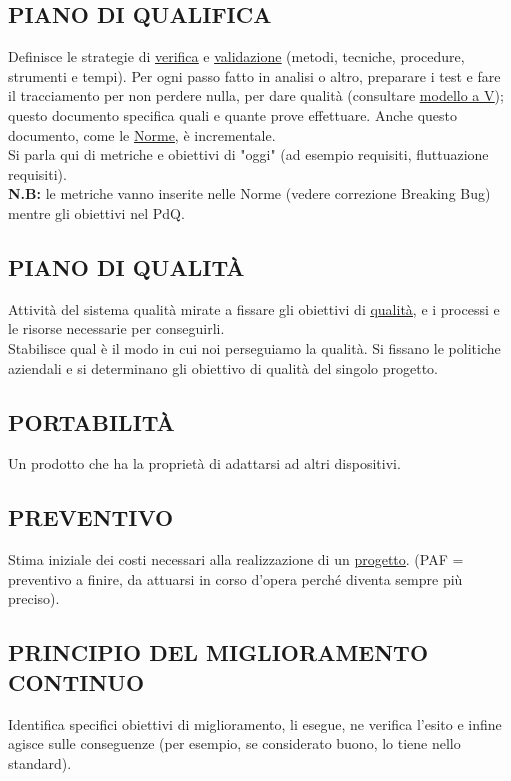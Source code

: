 		\subsection{PIANO DI QUALIFICA}		\label{pianoqualifica}
		Definisce le strategie di \underline{\hyperref[verificare]{verifica}} e \underline{\hyperref[validare]{validazione}} (metodi, tecniche, procedure, strumenti e tempi). Per ogni passo fatto in analisi o altro, preparare i test e fare il tracciamento per non perdere nulla, per dare qualità (consultare \underline{\hyperref[V]{modello a V}}); questo documento specifica quali e quante prove effettuare. Anche questo documento, come le \underline{\hyperref[norme]{Norme}}, è incrementale. \\
		Si parla qui di metriche e obiettivi di "oggi" (ad esempio requisiti, fluttuazione requisiti). \\
		\textbf{N.B:} le metriche vanno inserite nelle Norme (vedere correzione Breaking Bug) mentre gli obiettivi nel PdQ.
		
		\subsection{PIANO DI QUALITÀ}		\label{pianoqualita} %
		Attività del sistema qualità mirate a fissare gli obiettivi di \underline{\hyperref[qualita]{qualità}}, e i processi e le risorse necessarie per conseguirli. \\
		Stabilisce qual è il modo in cui noi perseguiamo la qualità. Si fissano le politiche aziendali e si determinano gli obiettivo di qualità del singolo progetto.
		
		\subsection{PORTABILITÀ}		\label{portabilita}
		Un prodotto che ha la proprietà di adattarsi ad altri dispositivi.
		  		 
		\subsection{PREVENTIVO}  \label{preventivo}
		Stima iniziale dei costi necessari alla realizzazione di un \underline{\hyperref[progetto]{progetto}}. (PAF = preventivo a finire, da attuarsi in corso d'opera perché diventa sempre più preciso).
	
		\subsection{PRINCIPIO DEL MIGLIORAMENTO CONTINUO}  \label{miglioramentocontinuo}
		Identifica specifici obiettivi di miglioramento, li esegue, ne verifica l'esito e infine agisce sulle conseguenze (per esempio, se considerato buono, lo tiene nello standard).
		
